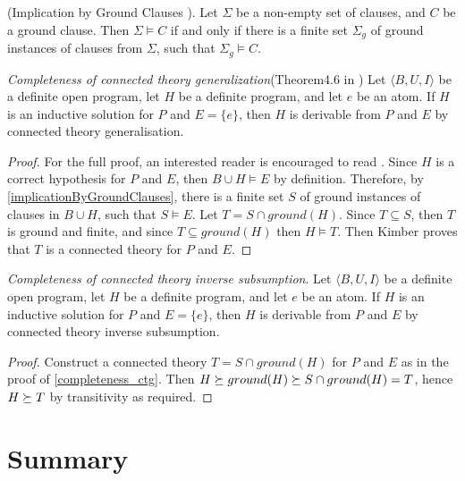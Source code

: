 \begin{thm}\label{implicationByGroundClauses}
(Implication by Ground Clauses \cite{nienhuys1997foundations}). Let $\Sigma$ be a non-empty set of clauses,
and $C$ be a ground clause. Then $\Sigma \models C$ if and only if there is a finite set $\Sigma_g$ of ground
instances of clauses from $\Sigma$, such that $\Sigma_g \models C$.
\end{thm}

\begin{thm}\label{completeness_ctg}
\emph{Completeness of connected theory generalization}(Theorem4.6 in \cite{kimber2012learning})
Let $\langle B, U, I \rangle$ be a definite open program,
let $H$ be a definite program, and let $e$ be an atom.
If $H$ is an inductive solution for $P$ and
$E = \{e\}$, then $H$ is derivable from $P$ and $E$ by connected theory generalisation.
\end{thm}
\begin{proof}\cite{kimber2012learning}
For the full proof, an interested reader is encouraged to read \cite{kimber2012learning}.
Since $H$ is a correct hypothesis for $P$ and $E$,
then $B \cup H \models E$ by definition.
Therefore, by \ref{implicationByGroundClauses}, there is a finite set $S$ of ground instances of clauses in $B \cup H$,
such that $S \models E$. Let $T = S \cap ground(H)$.
Since $T \subseteq S$, then $T$ is ground and finite, and
since $T \subseteq ground(H)$ then $H \models T$. 
Then Kimber proves that $T$ is a connected theory for $P$ and $E$.
\end{proof}

\begin{thm}
\emph{Completeness of connected theory inverse subsumption}.
\label{completeness_ctis}
Let $\langle B, U, I \rangle$ be a definite open program,
let $H$ be a definite program, and let $e$ be an atom.
If $H$ is an inductive solution for $P$ and
$E = \{e\}$, then $H$ is derivable from $P$ and $E$ by connected theory inverse subsumption.
\end{thm}
\begin{proof}
Construct a connected theory $T=S \cap ground(H)$ for $P$ and $E$ as in the proof of \ref{completeness_ctg}.
Then $H \succeq ground(H) \succeq S \cap ground(H) = T$,
hence $H \succeq T$ by transitivity as required.
\end{proof}

\section{Summary}

